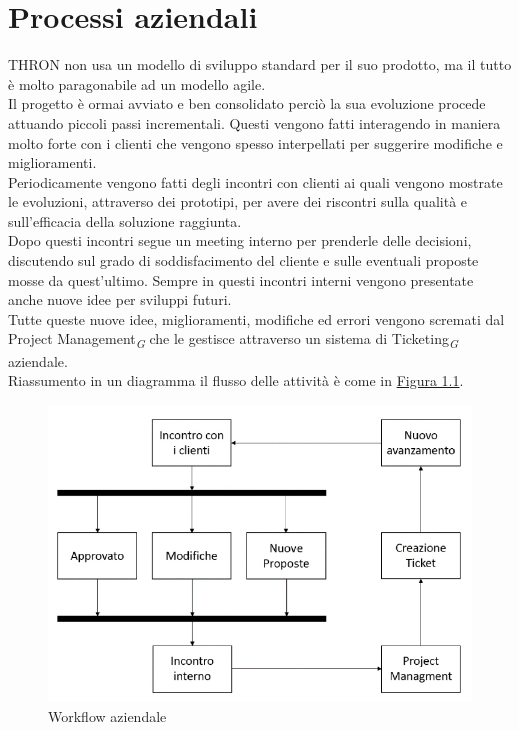 \documentclass[a4paper, 12pt, twoside, openright]{book}
\newcommand{\gloss}[1]{#1\textsubscript{\textit{\tiny{G}}}}
\begin{document}
\section{Processi aziendali}
THRON non usa un modello di sviluppo standard per il suo prodotto, ma il tutto è molto paragonabile ad un modello agile.\\
Il progetto è ormai avviato e ben consolidato perciò la sua evoluzione procede attuando piccoli passi incrementali. Questi vengono fatti interagendo in maniera molto forte con i clienti che vengono spesso interpellati per suggerire modifiche e miglioramenti.\\
Periodicamente vengono fatti degli incontri con clienti ai quali vengono mostrate le evoluzioni, attraverso dei prototipi, per avere dei riscontri sulla qualità e sull'efficacia della soluzione raggiunta.\\
Dopo questi incontri segue un meeting interno per prenderle delle decisioni, discutendo sul grado di soddisfacimento del cliente e sulle eventuali proposte mosse da quest'ultimo. Sempre in questi incontri interni vengono presentate anche nuove idee per sviluppi futuri.\\
Tutte queste nuove idee, miglioramenti, modifiche ed errori vengono scremati dal \gloss{Project Management} che le gestisce attraverso un \gloss{sistema di Ticketing} aziendale.\\
Riassumento in un diagramma il flusso delle attività è come in \hyperref[thron-workflow]{Figura 1.1}. 
\begin{figure}[H]
	\centering
	\label{thron-workflow}
	\includegraphics[width=1.0\textwidth]{images/thron-workflow.jpg}
	\caption{Workflow aziendale}
\end{figure}
\end{document}
